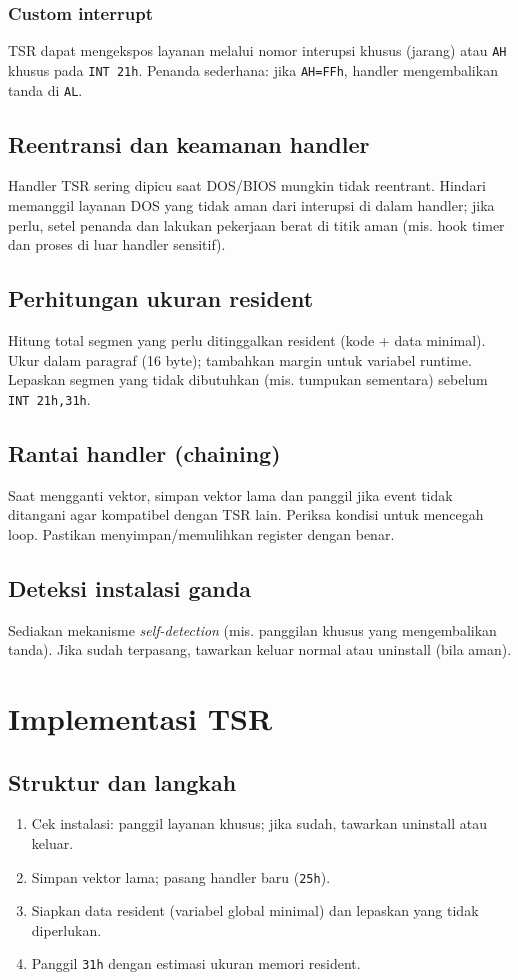 \subsubsection{Custom interrupt}
TSR dapat mengekspos layanan melalui nomor interupsi khusus (jarang) atau \texttt{AH} khusus pada \texttt{INT 21h}. Penanda sederhana: jika \texttt{AH=FFh}, handler mengembalikan tanda di \texttt{AL}.

\subsection{Reentransi dan keamanan handler}
Handler TSR sering dipicu saat DOS/BIOS mungkin tidak reentrant. Hindari memanggil layanan DOS yang tidak aman dari interupsi di dalam handler; jika perlu, setel penanda dan lakukan pekerjaan berat di titik aman (mis. hook timer dan proses di luar handler sensitif). \cite{rbil}

\subsection{Perhitungan ukuran resident}
Hitung total segmen yang perlu ditinggalkan resident (kode + data minimal). Ukur dalam paragraf (16 byte); tambahkan margin untuk variabel runtime. Lepaskan segmen yang tidak dibutuhkan (mis. tumpukan sementara) sebelum \texttt{INT 21h,31h}. \cite{rbil}

\subsection{Rantai handler (chaining)}
Saat mengganti vektor, simpan vektor lama dan panggil jika event tidak ditangani agar kompatibel dengan TSR lain. Periksa kondisi untuk mencegah loop. Pastikan menyimpan/memulihkan register dengan benar. \cite{rbil}

\subsection{Deteksi instalasi ganda}
Sediakan mekanisme \textit{self-detection} (mis. panggilan khusus yang mengembalikan tanda). Jika sudah terpasang, tawarkan keluar normal atau uninstall (bila aman). \cite{rbil}

\section{Implementasi TSR}
\subsection{Struktur dan langkah}
\begin{enumerate}
  \item Cek instalasi: panggil layanan khusus; jika sudah, tawarkan uninstall atau keluar.
  \item Simpan vektor lama; pasang handler baru (\texttt{25h}).
  \item Siapkan data resident (variabel global minimal) dan lepaskan yang tidak diperlukan.
  \item Panggil \texttt{31h} dengan estimasi ukuran memori resident.
\end{enumerate}

